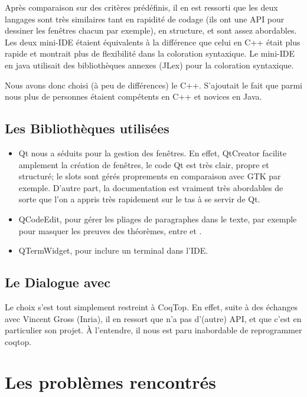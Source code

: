 Après comparaison sur des critères prédéfinis, il en est ressorti que les deux langages sont très similaires tant en rapidité de codage (ils ont une API pour dessiner les fenêtres chacun par exemple), en structure, et sont assez abordables.
Les deux mini-IDE étaient équivalents à la différence que celui en C++ était plus rapide et montrait plus de flexibilité dans la coloration syntaxique. Le mini-IDE en java utilisait des bibliothèques annexes (JLex) pour la coloration syntaxique.
    
Nous avons donc choisi (à peu de différences) le C++. S'ajoutait le fait que parmi nous plus de personnes étaient compétents en C++ et novices en Java.

\subsection{Les Bibliothèques utilisées}

\begin{itemize} 
  \item Qt nous a séduits pour la gestion des fenêtres.
    En effet, QtCreator facilite amplement la création de fenêtres, le code Qt est très clair, propre et structuré; le slots sont gérés proprements en comparaison avec GTK par exemple.
    D'autre part, la documentation est vraiment très abordables de sorte que l'on a appris très rapidement sur le tas à se servir de Qt.
    
  \item QCodeEdit, pour gérer les pliages de paragraphes dans le texte, par exemple pour masquer les preuves des théorèmes, entre  et .
  
  \item QTermWidget, pour inclure un terminal dans l'IDE.  
\end{itemize}

\subsection{Le Dialogue avec \Coq{}}
    
Le choix s'est tout simplement restreint à CoqTop. 
En effet, suite à des échanges avec Vincent Gross (Inria), il en ressort que \Coq{} n'a pas d'(autre) API, et que c'est en particulier son projet. À l'entendre, il nous est paru inabordable de reprogrammer coqtop. 
        
\section{Les problèmes rencontrés}

